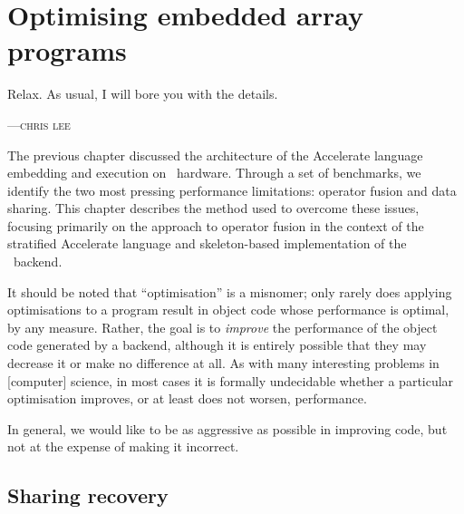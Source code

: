 
\chapter{Optimising embedded array programs}
\label{ch:optimising}
\epigraph{Relax. As usual, I will bore you with the details.}%
{\textsc{---chris lee}}


The previous chapter discussed the architecture of the Accelerate language
embedding and execution on \CUDA\ hardware. Through a set of benchmarks, we
identify the two most pressing performance limitations: operator fusion and data
sharing. This chapter describes the method used to overcome these issues,
focusing primarily on the approach to operator fusion in the context of the
stratified Accelerate language and skeleton-based implementation of the \CUDA\
backend.

It should be noted that ``optimisation'' is a misnomer; only rarely does
applying optimisations to a program result in object code whose performance is
optimal, by any measure. Rather, the goal is to \emph{improve} the performance
of the object code generated by a backend, although it is entirely possible that
they may decrease it or make no difference at all. As with many interesting
problems in [computer] science, in most cases it is formally undecidable whether
a particular optimisation improves, or at least does not worsen, performance.

In general, we would like to be as aggressive as possible in improving code, but
not at the expense of making it incorrect.


% 

\section{Sharing recovery}
\label{sec:sharing_recovery}

